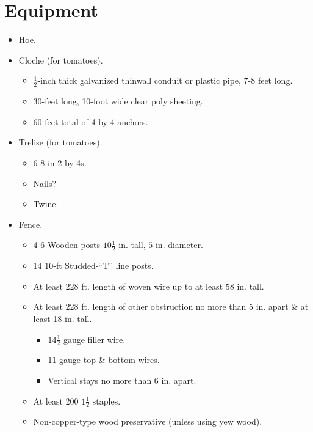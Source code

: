 \documentclass{article}
\begin{document}
\section*{Equipment}
\begin{itemize}
	\itemsep0em
	\item Hoe.
	\item Cloche (for tomatoes).
	\begin{itemize}
		\itemsep0em
		\item $\frac{1}{2}$-inch thick galvanized thinwall conduit or plastic pipe, 7-8 feet long.
		\item 30-feet long, 10-foot wide clear poly sheeting.
		\item 60 feet total of 4-by-4 anchors.
	\end{itemize}
	\item Trelise (for tomatoes).
	\begin{itemize}
		\itemsep0em
		\item 6 $8$-in 2-by-4s.
		\item Nails?
		\item Twine.
	\end{itemize}
	\item Fence.
	\begin{itemize}
		\itemsep0em
		\item 4-6 Wooden posts $10 \frac{1}{2}$ in. tall, $5$ in. diameter.
		\item 14 10-ft Studded-``T'' line posts.
		\item At least 228 ft. length of woven wire up to at least $58$ in. tall.
		\item At least 228 ft. length of other obstruction no more than 5 in. apart \& at least 18 in. tall.
		\begin{itemize}
			\item $14 \frac{1}{2}$ gauge filler wire.
			\item 11 gauge top \& bottom wires.
			\item Vertical stays no more than $6$ in. apart.
		\end{itemize}
		\item At least 200 $1 \frac{1}{2}$ staples.
		\item Non-copper-type wood preservative (unless using yew wood).
	\end{itemize}
\end{itemize}
\end{document}
